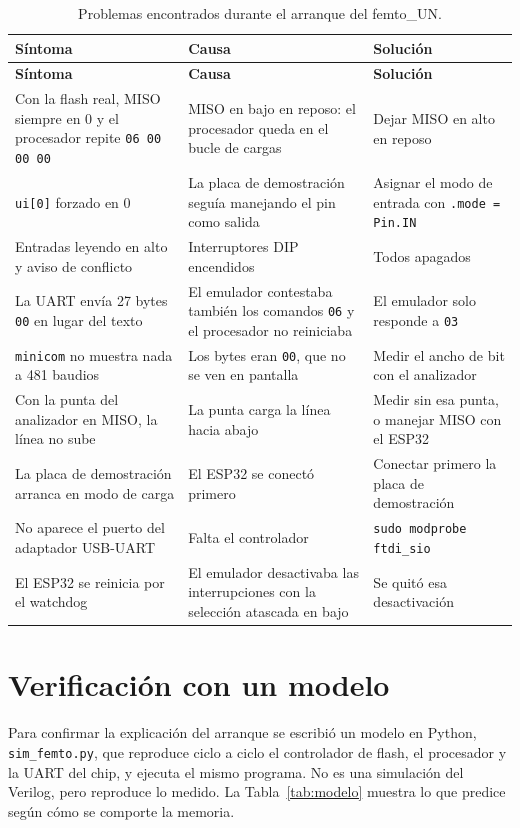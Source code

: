 \documentclass[11pt,letterpaper,oneside]{report}
\newcommand{\code}[1]{\texttt{#1}}
\begin{document}
{\small
\begin{longtable}{>{\raggedright\arraybackslash}p{4.4cm} >{\raggedright\arraybackslash}p{5cm} >{\raggedright\arraybackslash}p{5cm}}
\caption{Problemas encontrados durante el arranque del femto\_UN.}\label{tab:problemas_flash}\\
\toprule
\textbf{Síntoma} & \textbf{Causa} & \textbf{Solución} \\
\midrule
\endfirsthead
\toprule
\textbf{Síntoma} & \textbf{Causa} & \textbf{Solución} \\
\midrule
\endhead
Con la flash real, MISO siempre en 0 y el procesador repite \code{06 00 00 00} & MISO en bajo en reposo: el procesador queda en el bucle de cargas & Dejar MISO en alto en reposo \\
\code{ui[0]} forzado en 0 & La placa de demostración seguía manejando el pin como salida & Asignar el modo de entrada con \code{.mode = Pin.IN} \\
Entradas leyendo en alto y aviso de conflicto & Interruptores DIP encendidos & Todos apagados \\
La UART envía 27 bytes \code{00} en lugar del texto & El emulador contestaba también los comandos \code{06} y el procesador no reiniciaba & El emulador solo responde a \code{03} \\
\code{minicom} no muestra nada a 481 baudios & Los bytes eran \code{00}, que no se ven en pantalla & Medir el ancho de bit con el analizador \\
Con la punta del analizador en MISO, la línea no sube & La punta carga la línea hacia abajo & Medir sin esa punta, o manejar MISO con el ESP32 \\
La placa de demostración arranca en modo de carga & El ESP32 se conectó primero & Conectar primero la placa de demostración \\
No aparece el puerto del adaptador USB-UART & Falta el controlador & \code{sudo modprobe ftdi\_sio} \\
El ESP32 se reinicia por el watchdog & El emulador desactivaba las interrupciones con la selección atascada en bajo & Se quitó esa desactivación \\
\bottomrule
\end{longtable}
}

\section{Verificación con un modelo}

Para confirmar la explicación del arranque se escribió un modelo en Python, \code{sim\_femto.py}, que reproduce ciclo a ciclo el controlador de flash, el procesador y la UART del chip, y ejecuta el mismo programa. No es una simulación del Verilog, pero reproduce lo medido. La Tabla~\ref{tab:modelo} muestra lo que predice según cómo se comporte la memoria.
\end{document}
